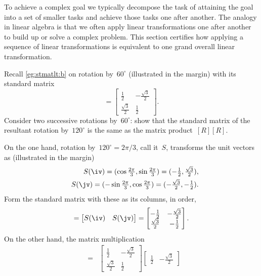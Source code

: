 To achieve a complex goal we typically decompose the task of attaining the goal into a set of smaller tasks and achieve those tasks one after another.
The analogy in linear algebra is that we often apply linear transformations one after another to build up or solve a complex problem.
This section certifies how applying a sequence of linear transformations is equivalent to one grand overall linear transformation.

\begin{example} 
Recall \autoref{eg:stmatlt:b} on rotation by~\(60^\circ\) (illustrated in the margin) with its standard matrix
%
\begin{equation*}
[R]=\begin{bmatrix} \frac12&-\frac{\sqrt3}2
\\\frac{\sqrt3}2&\frac12 \end{bmatrix}.
\end{equation*}
Consider two successive rotations by~\(60^\circ\): show that the standard matrix of the resultant rotation by~\(120^\circ\)  is the same as the matrix product~\([R][R]\).
\begin{solution} 
On the one hand, rotation by~\(120^\circ=2\pi/3\), call it~\(S\), transforms the unit vectors as (illustrated in the margin)
%
\begin{eqnarray*}
&&S(\iv)=(\cos\tfrac{2\pi}3,\sin\tfrac{2\pi}3)
=(-\tfrac12,\tfrac{\sqrt3}2),
\\&&S(\jv)=(-\sin\tfrac{2\pi}3,\cos\tfrac{2\pi}3)
=(-\tfrac{\sqrt3}2,-\tfrac12).
\end{eqnarray*}
Form the standard matrix with these as its columns, in order,
\begin{equation*}
[S]=\begin{bmatrix} S(\iv)&S(\jv) \end{bmatrix}
=\begin{bmatrix} -\frac12&-\frac{\sqrt3}2
\\\frac{\sqrt3}2&-\frac12 \end{bmatrix}.
\end{equation*}
On the other hand, the matrix multiplication
\begin{eqnarray*}
[R][R]
&=&\begin{bmatrix} \frac12&-\frac{\sqrt3}2
\\\frac{\sqrt3}2&\frac12 \end{bmatrix}\begin{bmatrix} \frac12&-\frac{\sqrt3}2

\end{bmatrix}
\end{eqnarray*}
\end{solution}
\end{example}
